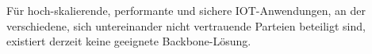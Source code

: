 \documentclass[
    ngerman,american
    ]{scrartcl}
\newcommand{\lang}{de}
\begin{document}
        \begin{description}[style=unboxed]
            \item [\questionOne{\lang}]
		
		Für hoch-skalierende, performante und sichere IOT-Anwendungen, an der verschiedene, sich untereinander nicht vertrauende Parteien beteiligt sind, existiert derzeit keine geeignete Backbone-Lösung.


\end{description}
\end{document}
